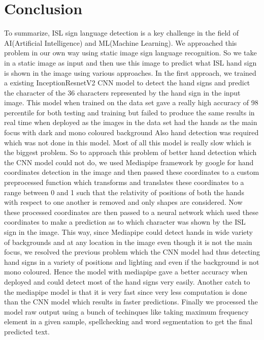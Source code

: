 \documentclass[12pt,a4paper]{report}
\begin{document}
\chapter{Conclusion}
To summarize, ISL sign language detection is a key challenge in the field of AI(Artificial Intelligence) and ML(Machine Learning). We approached this problem in our own way using static image sign language recognition. So we take in a static image as input and then use this image to predict what ISL hand sign is shown in the image using various approaches. In the first approach, we trained a existing InceptionResnetV2 CNN model to detect the hand signs and predict the character of the 36 characters represented by the hand sign in the input image. This model when trained on the data set gave a really high accuracy of 98 percentile for both testing and training but failed to produce the same results in real time when deployed as the images in the data set had the hands as the main focus with dark and mono coloured background Also hand detection was required which was not done in this model. Most of all this model is really slow which is the biggest problem. So to approach this problem of better hand detection which the CNN model could not do, we used Mediapipe framework by google for hand coordinates detection in the image and then passed these coordinates to a custom preprocessed function which transforms and translates these coordinates to a range between 0 and 1 such that the relativity of positions of both the hands with respect to one another is removed and only shapes are considered. Now these processed coordinates are then passed to a neural network which used these coordinates to make a prediction as to which character was shown by the ISL sign in the image. This way, since Mediapipe could detect hands in wide variety of backgrounds and at any location in the image even though it is not the main focus, we resolved the previous problem which the CNN model had thus detecting hand signs in a variety of positions and lighting and even if the background is not mono coloured. Hence the model with mediapipe gave a better accuracy when deployed and could detect most of the hand signs very easily. Another catch to the mediapipe model is that it is very fast since very less computation is done than the CNN model which results in faster predictions. Finally we processed the model raw output using a bunch of techinques like taking maximum frequency element in a given sample, spellchecking and word segmentation to get the final predicted text.
\end{document}
